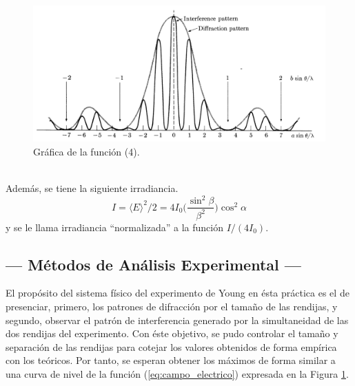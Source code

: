 \documentclass[12pt,a4paper]{article}
\begin{document}
\begin{figure}[hbt!]
	\centering
	\includegraphics[width= 0.7 \linewidth]{1_INTRO/grafica}
	\caption{Gráfica de la función (4).}
	\label{fig:grafica}
\end{figure}\\
Además, se tiene la siguiente irradiancia.
\begin{equation}
	I= \langle E \rangle ^2/2 = 4I_0 \bigg(\dfrac{\sin ^2 \beta}{\beta ^2}\bigg) \cos ^2\alpha
	\label{eq:irradiancia}
\end{equation}
y se le llama irradiancia ``normalizada'' a la función \(I/(4I_0)\).

\subsection{--- Métodos de Análisis Experimental ---} %
\label{sub:metodos_analisis}
El propósito del sistema físico del experimento de Young en ésta práctica es el de presenciar, primero, los patrones de difracción por el tamaño de las rendijas, y segundo, observar el patrón de interferencia generado por la simultaneidad de las dos rendijas del experimento.
Con éste objetivo, se pudo controlar el tamaño y separación de las rendijas para cotejar los valores obtenidos de forma empírica con los teóricos.
Por tanto, se esperan obtener los máximos de forma similar a una curva de nivel de la función (\ref{eq:campo_electrico}) expresada en la Figura \ref{fig:grafica}.

\end{document}
